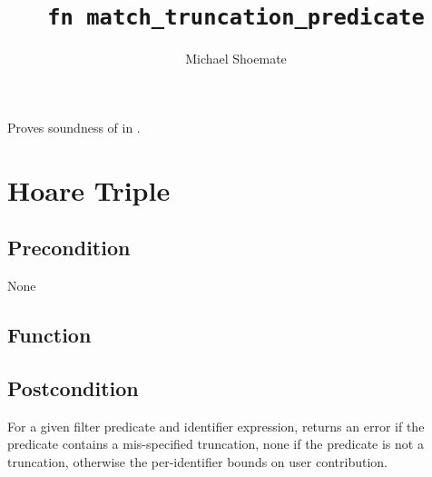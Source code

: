 \documentclass{article}
\title{\texttt{fn match\_truncation\_predicate}}
\author{Michael Shoemate}
\begin{document}
\maketitle  


\contrib

Proves soundness of  
in .

\section{Hoare Triple}
\subsection*{Precondition}
None 

\subsection*{Function}
\label{sec:python-pseudocode}


\subsection*{Postcondition}
\begin{theorem}[Postcondition]
    For a given filter predicate and identifier expression,
    returns an error if the predicate contains a mis-specified truncation,
    none if the predicate is not a truncation,
    otherwise the per-identifier bounds on user contribution.
\end{theorem}
\end{document}
